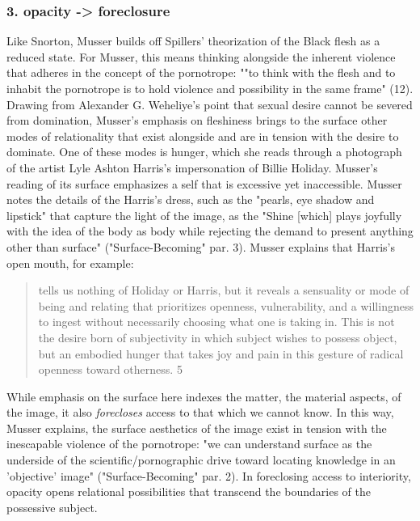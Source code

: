 \documentclass[11pt]{article}
\begin{document}
\subsubsection{3. opacity -> foreclosure}
\label{sec:org6af4645}
Like Snorton, Musser builds off Spillers' theorization of the Black
flesh as a reduced state. For Musser, this means thinking alongside
the inherent violence that adheres in the concept of the pornotrope:
""to think with the flesh and to inhabit the pornotrope is to hold
violence and possibility in the same frame" (12). Drawing from
Alexander G. Weheliye's point that sexual desire cannot be severed
from domination, Musser's emphasis on fleshiness brings to the surface
other modes of relationality that exist alongside and are in tension
with the desire to dominate. One of these modes is hunger, which she
reads through a photograph of the artist Lyle Ashton Harris's
impersonation of Billie Holiday. Musser's reading of its surface
emphasizes a self that is excessive yet inaccessible. Musser notes the
details of the Harris's dress, such as the "pearls, eye shadow and
lipstick" that capture the light of the image, as the "Shine [which]
plays joyfully with the idea of the body as body while rejecting the
demand to present anything other than surface" ("Surface-Becoming"
par. 3). Musser explains that Harris's open mouth, for example: 
\begin{quote}
tells us nothing of Holiday or Harris, but it reveals a sensuality or
mode of being and relating that prioritizes openness, vulnerability,
and a willingness to ingest without necessarily choosing what one is
taking in. This is not the desire born of subjectivity in which
subject wishes to possess object, but an embodied hunger that takes
joy and pain in this gesture of radical openness toward otherness. 5
\end{quote}
While emphasis on the surface here indexes the matter, the material
aspects, of the image, it also \emph{forecloses} access to that which we
cannot know. In this way, Musser explains, the surface aesthetics of
the image exist in tension with the inescapable violence of the
pornotrope: "we can understand surface as the underside of the
scientific/pornographic drive toward locating knowledge in an
'objective' image" ("Surface-Becoming" par. 2). In foreclosing access
to interiority, opacity opens relational possibilities that transcend
the boundaries of the possessive subject.
\end{document}
